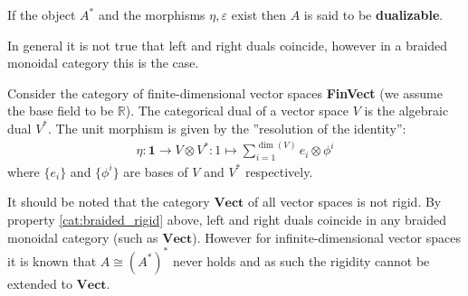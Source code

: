 {        If the object $A^*$ and the morphisms $\eta, \varepsilon$ exist then $A$ is said to be \textbf{dualizable}.
    }


    \begin{property}\label{cat:braided_rigid}
        In general it is not true that left and right duals coincide, however in a braided monoidal category this is the case.
    \end{property}

    \begin{example}[FinVect]
        Consider the category of finite-dimensional vector spaces \textbf{FinVect} (we assume the base field to be $\mathbb{R}$). The categorical dual of a vector space $V$ is the algebraic dual $V^*$. The unit morphism is given by the ''resolution of the identity'':
        \begin{gather}
            \eta: \mathbf{1}\rightarrow V\otimes V^*:1\mapsto\sum_{i=1}^{\dim(V)}e_i\otimes \phi^i
        \end{gather}
        where $\{e_i\}$ and $\{\phi^i\}$ are bases of $V$ and $V^*$ respectively.

        It should be noted that the category $\textbf{Vect}$ of all vector spaces is not rigid. By property \ref{cat:braided_rigid} above, left and right duals coincide in any braided monoidal category (such as $\textbf{Vect}$). However for infinite-dimensional vector spaces it is known that $A\cong(A^*)^*$ never holds and as such the rigidity cannot be extended to $\textbf{Vect}$.
    \end{example}

